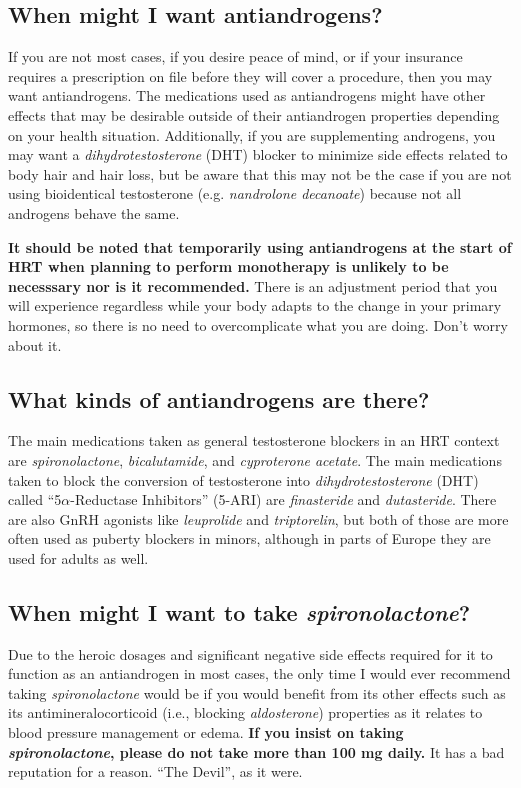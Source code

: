 \documentclass{article}
\begin{document}
\subsection{When might I want antiandrogens?}

If you are not most cases, if you desire peace of mind, or if your insurance requires a prescription on file before they will cover a procedure, then you may want antiandrogens. The medications used as antiandrogens might have other effects that may be desirable outside of their antiandrogen properties depending on your health situation. Additionally, if you are supplementing androgens, you may want a \textit{dihydrotestosterone} (DHT) blocker to minimize side effects related to body hair and hair loss, but be aware that this may not be the case if you are not using bioidentical testosterone (e.g. \textit{nandrolone decanoate}) because not all androgens behave the same.

\textbf{It should be noted that temporarily using antiandrogens at the start of HRT when planning to perform monotherapy is unlikely to be necesssary nor is it recommended.} There is an adjustment period that you will experience regardless while your body adapts to the change in your primary hormones, so there is no need to overcomplicate what you are doing. Don't worry about it.

\subsection{What kinds of antiandrogens are there?}

The main medications taken as general testosterone blockers in an HRT context are \textit{spironolactone}, \textit{bicalutamide}, and \textit{cyproterone acetate}. The main medications taken to block the conversion of testosterone into \textit{dihydrotestosterone} (DHT) called “5$\alpha$-Reductase Inhibitors” (5-ARI) are \textit{finasteride} and \textit{dutasteride}. There are also GnRH agonists like \textit{leuprolide} and \textit{triptorelin}, but both of those are more often used as puberty blockers in minors, although in parts of Europe they are used for adults as well.

\subsection{When might I want to take \textit{spironolactone}?}

Due to the heroic dosages and significant negative side effects required for it to function as an antiandrogen in most cases, the only time I would ever recommend taking \textit{spironolactone} would be if you would benefit from its other effects such as its antimineralocorticoid (i.e., blocking \textit{aldosterone}) properties as it relates to blood pressure management or edema. \textbf{If you insist on taking \textit{spironolactone}, please do not take more than 100 mg daily.} It has a bad reputation for a reason. “The Devil”, as it were.
\end{document}
